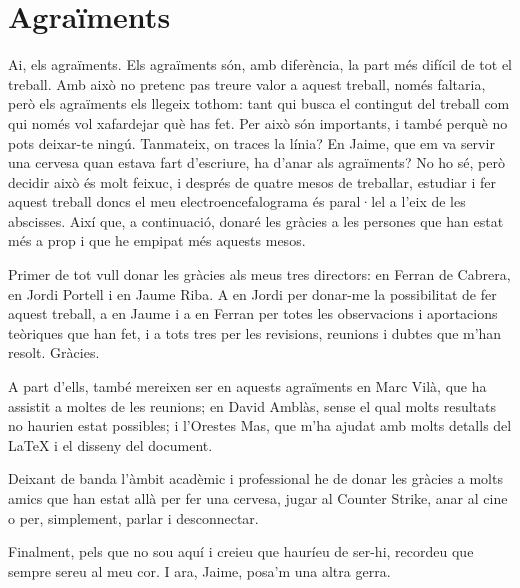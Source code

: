 \chapter*{Agraïments}
Ai, els agraïments. Els agraïments són, amb diferència, la part més difícil de tot el treball. Amb això no pretenc pas treure valor a aquest treball, només faltaria, però els agraïments els llegeix tothom: tant qui busca el contingut del treball com qui només vol xafardejar què has fet. Per això són importants, i també perquè no pots deixar-te ningú. Tanmateix, on traces la línia? En Jaime, que em va servir una cervesa quan estava fart d'escriure, ha d'anar als agraïments? No ho sé, però decidir això és molt feixuc, i després de quatre mesos de treballar, estudiar i fer aquest treball doncs el meu electroencefalograma és paral·lel a l'eix de les abscisses. Així que, a continuació, donaré les gràcies a les persones que han estat més a prop i que he empipat més aquests mesos.

Primer de tot vull donar les gràcies als meus tres directors: en Ferran de Cabrera, en Jordi Portell i en Jaume Riba. A en Jordi per donar-me la possibilitat de fer aquest treball, a en Jaume i a en Ferran per totes les observacions i aportacions teòriques que han fet, i a tots tres per les revisions, reunions i dubtes que m'han resolt. Gràcies.

A part d'ells, també mereixen ser en aquests agraïments en Marc Vilà, que ha assistit a moltes de les reunions; en David Amblàs, sense el qual molts resultats no haurien estat possibles; i l'Orestes Mas, que m'ha ajudat amb molts detalls del LaTeX i el disseny del document.

Deixant de banda l'àmbit acadèmic i professional he de donar les gràcies a molts amics que han estat allà per fer una cervesa, jugar al Counter Strike, anar al cine o per, simplement, parlar i desconnectar.

Finalment, pels que no sou aquí i creieu que hauríeu de ser-hi, recordeu que sempre sereu al meu cor. I ara, Jaime, posa'm una altra gerra.
